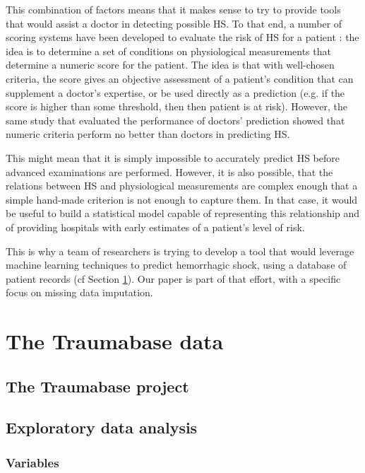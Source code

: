 \documentclass[12pt, a4paper]{memoir}
\begin{document}
This combination of factors means that it makes sense to try to provide tools that would assist a doctor in detecting possible HS. To that end, a number of scoring systems have been developed to evaluate the risk of HS for a patient \cite{Score1} \cite{Score2} \cite{...}: the idea is to determine a set of conditions on physiological measurements that determine a numeric score for the patient. The idea is that with well-chosen criteria, the score gives an objective assessment of a patient's condition that can supplement a doctor's expertise, or be used directly as a prediction (e.g. if the score is higher than some threshold, then then patient is at risk). However, the same study that evaluated the performance of doctors' prediction \cite{AUC_doctors} showed that numeric criteria perform no better than doctors in predicting HS.

This might mean that it is simply impossible to accurately predict HS before advanced examinations are performed. However, it is also possible, that the relations between HS and physiological measurements are complex enough that a simple hand-made criterion is not enough to capture them. In that case, it would be useful to build a statistical model capable of representing this relationship and of providing hospitals with early estimates of a patient's level of risk. 

This is why a team of researchers is trying to develop a tool that would leverage machine learning techniques to predict hemorrhagic shock, using a database of patient records (cf Section \ref{traumabase}). Our paper is part of that effort, with a specific focus on missing data imputation.



	\section{The Traumabase data}
	\label{traumabase}
		\subsection{The Traumabase project}
	
		\subsection{Exploratory data analysis}
			\subsubsection{Variables}
\end{document}
